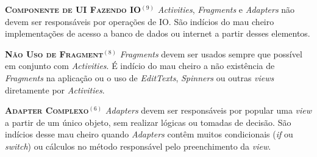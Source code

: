 

  \noindent
  \textsc{\textbf{{\small Componente de UI Fazendo IO}}}$^{(9)}$
      \textit{Activities}, \textit{Fragments} e \textit{Adapters} não devem ser responsáveis por operações de IO. São indícios do mau cheiro implementações de acesso a banco de dados ou internet a partir desses elementos.



  \noindent
  \textsc{\textbf{{\small Não Uso de Fragment}}}$^{(8)}$ \textit{Fragments} devem ser usados sempre que possível em conjunto com \textit{Activities}. É indício do mau cheiro a não existência de \textit{Fragments} na aplicação ou o uso de \textit{EditTexts}, \textit{Spinners} ou outras \textit{views} diretamente por \textit{Activities}.



  \noindent
  \textsc{\textbf{{\small Adapter Complexo}}}$^{(6)}$ \textit{Adapters} devem ser responsáveis por popular uma \textit{view} a partir de um único objeto, sem realizar lógicas ou tomadas de decisão. São indícios desse mau cheiro quando \textit{Adapters} contêm muitos condicionais (\textit{if} ou \textit{switch}) ou cálculos no método responsável pelo preenchimento da \textit{view}.




